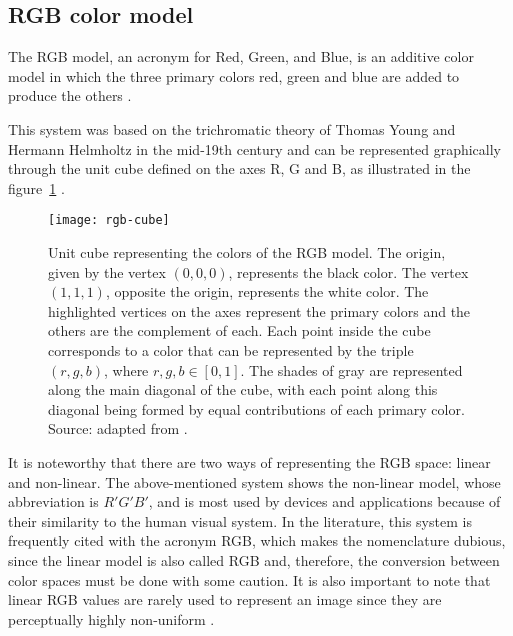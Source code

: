 \subsection{RGB color model}
\label{sec:modelo_cores_rgb}

The RGB model, an acronym for Red, Green, and Blue, is an additive color model in which the three primary colors red, green and blue are added to produce the others \citep{gonzalez:02}.

This system was based on the trichromatic theory of Thomas Young and Hermann Helmholtz in the mid-19th century and can be represented graphically
through the unit cube defined on the axes R, G and B, as illustrated in the figure~\ref{fig:rgb-cube} \citep{konstantinos:00}.

\begin{figure}[!ht]
  \centering
  \texttt{[image: rgb-cube]}
  \caption[Unit cube representing the colors of the RGB model]{Unit cube representing the colors of the RGB model. The origin, given by the vertex $(0, 0, 0)$, represents the black color. The vertex $(1, 1, 1)$, opposite the origin, represents the white color. The highlighted vertices on the axes represent the primary colors and the others are the complement of each. Each point inside the cube corresponds to a color that can be represented by the triple $(r, g, b)$, where $r, g, b \in [0, 1]$. The shades of gray are represented along the main diagonal of the cube, with each point along this diagonal being formed by equal contributions of each primary color. Source: adapted from \citet{gonzalez:02}.}
  \label{fig:rgb-cube} 
\end{figure}

It is noteworthy that there are two ways of representing the RGB space: linear and non-linear. The above-mentioned system shows the non-linear model, whose abbreviation is $R'G'B'$, and is most used by devices and applications because of their similarity to the human visual system. In the literature, this system is frequently cited with the acronym RGB, which makes the nomenclature dubious, since the linear model is also called RGB and, therefore, the conversion between color spaces must be done with some caution. It is also important to note that linear RGB values are rarely used to represent an image since they are perceptually highly non-uniform \citep{konstantinos:00}.


